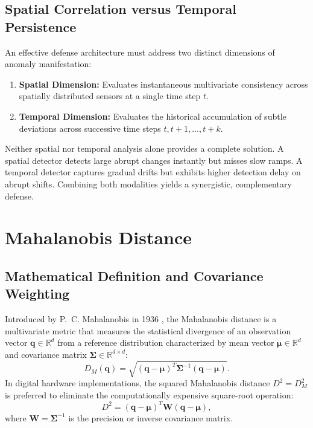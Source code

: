 \documentclass[12pt,a4paper]{report}
\begin{document}
\subsection{Spatial Correlation versus Temporal Persistence}
An effective defense architecture must address two distinct dimensions of anomaly manifestation:
\begin{enumerate}
    \item \textbf{Spatial Dimension:} Evaluates instantaneous multivariate consistency across
    spatially distributed sensors at a single time step $t$.
    \item \textbf{Temporal Dimension:} Evaluates the historical accumulation of subtle
    deviations across successive time steps $t, t+1, \dots, t+k$.
\end{enumerate}
Neither spatial nor temporal analysis alone provides a complete solution. A spatial detector
detects large abrupt changes instantly but misses slow ramps. A temporal detector captures
gradual drifts but exhibits higher detection delay on abrupt shifts. Combining both modalities
yields a synergistic, complementary defense.

\section{Mahalanobis Distance}

\subsection{Mathematical Definition and Covariance Weighting}
Introduced by P.~C. Mahalanobis in 1936 \cite{mahalanobis1936}, the Mahalanobis distance
is a multivariate metric that measures the statistical divergence of an observation vector
$\boldsymbol{q} \in \mathbb{R}^d$ from a reference distribution characterized by mean vector
$\boldsymbol{\mu} \in \mathbb{R}^d$ and covariance matrix $\boldsymbol{\Sigma} \in \mathbb{R}^{d \times d}$:
\begin{equation}
D_M(\boldsymbol{q}) = \sqrt{(\boldsymbol{q} - \boldsymbol{\mu})^T \boldsymbol{\Sigma}^{-1} (\boldsymbol{q} - \boldsymbol{\mu})}.
\label{eq:mahalanobis_def}
\end{equation}
In digital hardware implementations, the squared Mahalanobis distance $D^2 = D_M^2$ is
preferred to eliminate the computationally expensive square-root operation:
\begin{equation}
D^2 = (\boldsymbol{q} - \boldsymbol{\mu})^T \boldsymbol{W} (\boldsymbol{q} - \boldsymbol{\mu}),
\label{eq:mahalanobis_squared}
\end{equation}
where $\boldsymbol{W} = \boldsymbol{\Sigma}^{-1}$ is the precision or inverse covariance matrix.
\end{document}

